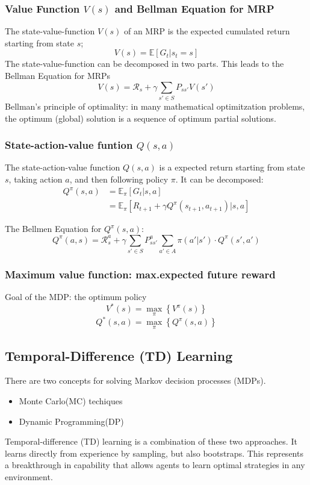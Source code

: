 \subsubsection{Value Function \(V(s)\) and Bellman Equation for MRP}
The state-value-function \(V(s)\) of an MRP is the expected cumulated return starting from state \(s\);
\[
V(s) = \mathbb{E}\left[G_t|s_t = s\right]
\]
The state-value-function can be decomposed in two parts.
This leads to the Bellman Equation for MRPs
\[
V(s) = \mathcal{R}_s + \gamma \sum_{s'\in S}P_{ss'}V(s') 
\]
Bellman's principle of optimality: in many mathematical optimitzation problems, the optimum (global) solution is a sequence of optimum partial solutions.

\subsubsection{State-action-value funtion \(Q(s,a)\)}
The state-action-value function \(Q(s,a)\) is a expected return starting from state \(s\), taking action \(a\), and then following policy \(\pi\).
It can be decomposed:
\begin{align*}
    Q^\pi(s,a) &= \mathbb{E}_\pi\left[G_t|s,a\right]\\
    &= \mathbb{E}_\pi\left[R_{t+1} + \gamma Q^\pi(s_{t+1},a_{t+1})|s,a\right]
\end{align*}

The Bellmen Equation for \(Q^\pi(s,a)\):
\[
Q^\pi(a,s) = \mathcal{R}_s^a + \gamma \sum_{s'\in S}P^a_{ss'}\sum_{a' \in A}\pi(a'|s')\cdot Q^\pi(s',a')
\]
\subsubsection{Maximum value function: max.expected future reward}
Goal of the MDP: the optimum policy
\[
V^*(s) = \max_{\pi}\left\{V^\pi(s)\right\}
\]
\[
Q^*(s,a) = \max_{\pi}\left\{Q^\pi(s,a)\right\}
\]
\subsection{Temporal-Difference (TD) Learning}
There are two concepts for solving Markov decision processes (MDPs).
\begin{itemize}
    \item Monte Carlo(MC) techiques
    \item Dynamic Programming(DP)
\end{itemize}
Temporal-difference (TD) learning is a combination of these two approaches. 
It learns directly from experience by sampling, but also bootstraps.
This represents a breakthrough in capability that allows agents to learn optimal strategies in any environment.
